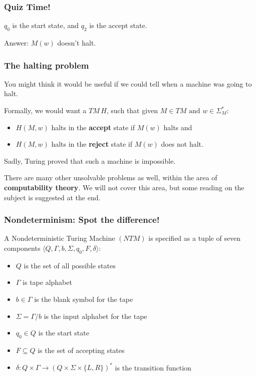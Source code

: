 \documentclass[aspectratio=169]{beamer}
\begin{document}
\begin{frame}
\frametitle{Quiz Time!}

\begin{center}
\end{center}

$q_0$ is the start state, and $q_2$ is the accept state.

Answer: $M(w)$ doesn't halt.
\end{frame}

\begin{frame}
\frametitle{The halting problem}
You might think it would be useful if we could tell when a machine was going to halt.

Formally, we would want a $TM\, H$, such that given $M \in TM \text{ and } w \in \Sigma_M^*$:

\begin{itemize}
	\item $H(M, w)$ halts in the {\bf accept} state if $M(w)$ halts and
	\item $H(M, w)$ halts in the {\bf reject} state if $M(w)$ does not halt.
\end{itemize}

Sadly, Turing proved that such a machine is impossible.

There are many other unsolvable problems as well, within the area of {\bf computability theory}. We will not cover this area, but some reading on the subject is suggested at the end.
\end{frame}

\begin{frame}
\frametitle{Nondeterminism: Spot the difference!}
A Nondeterministic Turing Machine $(NTM)$ is specified as a tuple of seven components $\langle Q, \Gamma, b, \Sigma, q_0, F, \delta \rangle$:

\begin{itemize}
	\item $Q$ is the set of all possible states
	\item $\Gamma$ is tape alphabet
	\item $b \in \Gamma$ is the blank symbol for the tape
	\item $\Sigma = \Gamma/b$ is the input alphabet for the tape
	\item $q_0 \in Q$ is the start state
	\item $F \subseteq Q$ is the set of accepting states
	\item $\delta: Q \times \Gamma \to (Q \times \Sigma \times \{L, R\})^*$ is the transition function
\end{itemize}
\end{frame}
\end{document}
